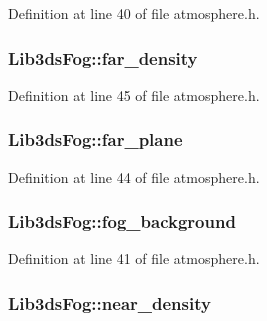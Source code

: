 Definition at line 40 of file atmosphere.\-h.

\hypertarget{struct_lib3ds_fog_a579e22fd33c5602107c25f10bc6a5dda}{
\subsubsection[{far\-\_\-density}]{ Lib3ds\-Fog\-::far\-\_\-density}}\label{struct_lib3ds_fog_a579e22fd33c5602107c25f10bc6a5dda}


Definition at line 45 of file atmosphere.\-h.

\hypertarget{struct_lib3ds_fog_a8965d29f652eb45b35c8bdddce2e5321}{
\subsubsection[{far\-\_\-plane}]{ Lib3ds\-Fog\-::far\-\_\-plane}}\label{struct_lib3ds_fog_a8965d29f652eb45b35c8bdddce2e5321}


Definition at line 44 of file atmosphere.\-h.

\hypertarget{struct_lib3ds_fog_abe6dead99e5d6892a317f98715e41b53}{
\subsubsection[{fog\-\_\-background}]{ Lib3ds\-Fog\-::fog\-\_\-background}}\label{struct_lib3ds_fog_abe6dead99e5d6892a317f98715e41b53}


Definition at line 41 of file atmosphere.\-h.

\hypertarget{struct_lib3ds_fog_accdad3b95d54b1dc402286faa2e230a6}{
\subsubsection[{near\-\_\-density}]{ Lib3ds\-Fog\-::near\-\_\-density}}\label{struct_lib3ds_fog_accdad3b95d54b1dc402286faa2e230a6}


